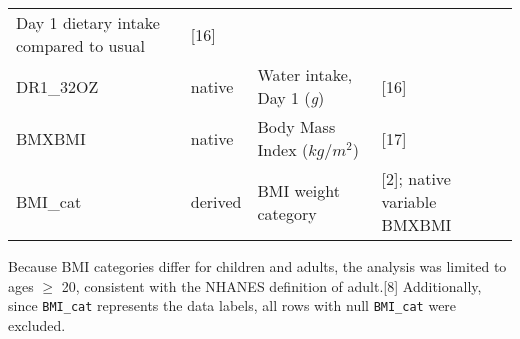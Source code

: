 \documentclass[]{article}
\begin{document}
\begin{longtable}[]{@{}llll@{}}
\begin{minipage}[t]{0.43\columnwidth}
Day 1 dietary intake compared to usual\strut
\end{minipage} & \begin{minipage}[t]{0.31\columnwidth}\raggedright
{[}16{]}\strut
\end{minipage}\tabularnewline
\begin{minipage}[t]{0.10\columnwidth}\raggedright
DR1\_32OZ\strut
\end{minipage} & \begin{minipage}[t]{0.05\columnwidth}\raggedright
native\strut
\end{minipage} & \begin{minipage}[t]{0.43\columnwidth}\raggedright
Water intake, Day 1 (\emph{g})\strut
\end{minipage} & \begin{minipage}[t]{0.31\columnwidth}\raggedright
{[}16{]}\strut
\end{minipage}\tabularnewline
\begin{minipage}[t]{0.10\columnwidth}\raggedright
BMXBMI\strut
\end{minipage} & \begin{minipage}[t]{0.05\columnwidth}\raggedright
native\strut
\end{minipage} & \begin{minipage}[t]{0.43\columnwidth}\raggedright
Body Mass Index (\(kg/m^{2}\))\strut
\end{minipage} & \begin{minipage}[t]{0.31\columnwidth}\raggedright
{[}17{]}\strut
\end{minipage}\tabularnewline
\begin{minipage}[t]{0.10\columnwidth}\raggedright
BMI\_cat\strut
\end{minipage} & \begin{minipage}[t]{0.05\columnwidth}\raggedright
derived\strut
\end{minipage} & \begin{minipage}[t]{0.43\columnwidth}\raggedright
BMI weight category\strut
\end{minipage} & \begin{minipage}[t]{0.31\columnwidth}\raggedright
{[}2{]}; native variable BMXBMI\strut
\end{minipage}\tabularnewline
\bottomrule
\end{longtable}

Because BMI categories differ for children and adults, the analysis was
limited to ages \(\ge\) 20, consistent with the NHANES definition of
adult.{[}8{]} Additionally, since \texttt{BMI\_cat} represents the data
labels, all rows with null \texttt{BMI\_cat} were excluded.
\end{document}
